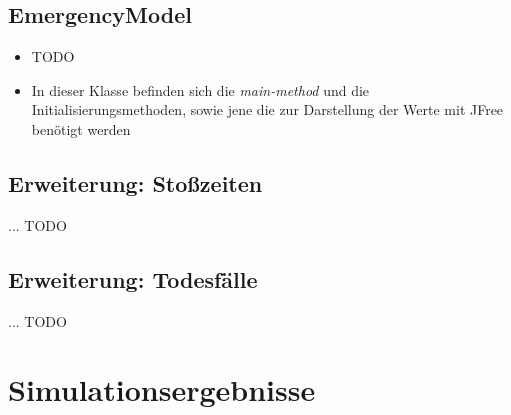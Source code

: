 \documentclass{article}
\begin{document}
\subsection{EmergencyModel}
\begin{itemize}
    \item TODO
    \item In dieser Klasse befinden sich die \textit{main-method} und die Initialisierungsmethoden, sowie jene die zur Darstellung der Werte mit JFree benötigt werden
\end{itemize}

\subsection{Erweiterung: Stoßzeiten}
... TODO

\subsection{Erweiterung: Todesfälle}
... TODO

\section{Simulationsergebnisse}
\end{document}
